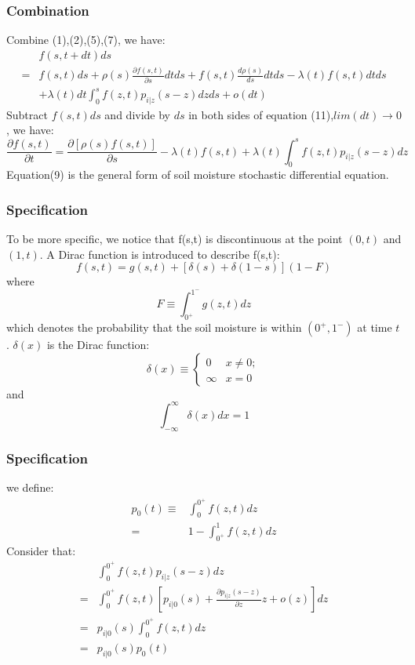 \documentclass{beamer}
\begin{document}
\begin{frame}
\frametitle{Combination}
Combine (1),(2),(5),(7), we have:
\begin{equation}
 \begin{split}
 &f(s,t+dt)ds\\=&f(s,t)ds+\rho(s)\frac{\partial{f(s,t)}}{\partial s}dtds+f(s,t)\frac{d\rho(s)}{ds}dtds-\lambda(t)f(s,t)dtds\\&+\lambda(t)dt\int_{0}^{s} f(z,t)p_{i|z}(s-z)dzds+o(dt)
 \end{split}
 \end{equation}
 Subtract $f(s,t)ds$ and divide by $ds$ in both sides of equation (11),$lim(dt)\rightarrow0$, we have:
 \begin{equation}
 \frac{\partial{f(s,t)}}{\partial t}=\frac{\partial{[\rho(s)f(s,t)]}}{\partial s}-\lambda(t)f(s,t)+\lambda(t)\int_{0}^{s} f(z,t)p_{i|z}(s-z)dz
 \end{equation}
 Equation(9) is the general form of soil moisture stochastic differential equation.
\end{frame}
\begin{frame}
\frametitle{Specification}
 To be more specific, we notice that f(s,t) is discontinuous at the point $(0,t)$ and $(1,t)$. A Dirac function is introduced to describe f(s,t):
 \begin{equation}
 f(s,t)=g(s,t)+[\delta(s)+\delta(1-s)](1-F)
 \end{equation} 
 where
 \begin{equation}
 F\equiv\int_{0^+}^{1^-} g(z,t)dz
 \end{equation}
 which denotes the probability that the soil moisture is within $(0^+,1^-)$ at time $t$ . $\delta (x)$ is the Dirac function:
 \begin{equation}
 \delta(x)\equiv
 \begin{cases}
 0&x\neq0;\\\infty&x=0
 \end{cases}
 \end{equation}
 and
 \begin{equation}
 \int_{-\infty}^{\infty} \delta(x)dx=1
 \end{equation}
\end{frame}
\begin{frame}
\frametitle{Specification}
we define:
 \begin{equation}
 \begin{split}
 p_0(t)\equiv&\int_0^{0^+} f(z,t)dz\\=&1-\int_{0^+}^1 f(z,t)dz
 \end{split}
 \end{equation}
 Consider that:
 \begin{equation}
 \begin{split}
 &\int_{0}^{0^+} f(z,t)p_{i|z}(s-z)dz\\=&\int_{0}^{0^+} f(z,t)[p_{i|0}(s)+\frac{\partial p_{i|z}(s-z)}{\partial z}z+o(z)]dz
 \\=&p_{i|0}(s)\int_{0}^{0^+} f(z,t)dz
 \\=&p_{i|0}(s)p_0(t)
 \end{split}
 \end{equation}
\end{frame}
\end{document}
